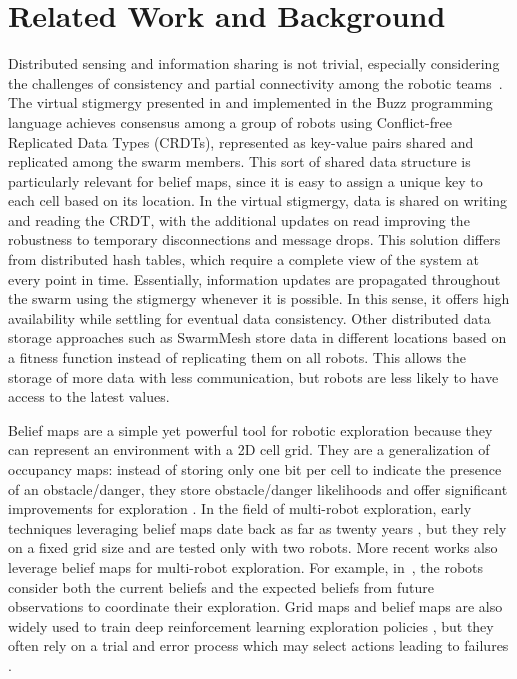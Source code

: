 \section{Related Work and Background}
Distributed sensing and information sharing is not trivial, especially considering
the challenges of consistency and partial connectivity among the
robotic teams~\cite{amigoni2017multirobot,otte2018emergent}. The virtual stigmergy
presented in \cite{pinciroliTuple2016} and implemented in the Buzz
programming language \cite{pinciroliBuzz2016} achieves consensus among
a group of robots using Conflict-free Replicated Data Types (CRDTs),
represented as key-value pairs shared and replicated among the swarm members. This sort of shared data structure is
particularly relevant for belief maps, since it is easy to assign a
unique key to each cell based on its location.  In the virtual
stigmergy, data is shared on writing and reading the CRDT, with the
additional updates on read improving the robustness to temporary
disconnections and message drops. This solution differs from
distributed hash tables, which require a complete view of the system
at every point in time. Essentially, information updates are propagated throughout the swarm using the stigmergy whenever it is possible. In this sense, it offers high availability while settling for eventual data consistency. Other distributed data storage approaches such
as SwarmMesh \cite{majcherczykSwarmmesh2020} store data in different
locations based on a fitness function instead of replicating them on
all robots. This allows the storage of more data with less
communication, but robots are less likely to have access to the latest
values.

Belief maps are a simple yet powerful tool for robotic exploration
because they can represent an environment with a 2D cell grid. They
are a generalization of occupancy maps: instead of storing only one
bit per cell to indicate the presence of an obstacle/danger, they
store obstacle/danger likelihoods and offer significant improvements
for exploration \cite{stachnissMappingExplorationMobile2003}. In the
field of multi-robot exploration, early techniques leveraging belief
maps date back as far as twenty years
\cite{kobayashiSharingExploringInformation2002,kobayashiDeterminationExplorationTarget2003},
but they rely on a fixed grid size and are tested only with two
robots. More recent works also leverage belief maps for multi-robot
exploration. For example,
in~\cite{indelmanCooperativeMultirobotBelief2018}, the robots consider
both the current beliefs and the expected beliefs from future
observations to coordinate their exploration. Grid maps and belief
maps are also widely used to train deep reinforcement learning
exploration policies
\cite{hanGridWiseControlMultiAgent,panovGridPathPlanning2018}, but they often rely on a trial and error process which may select actions leading to failures \cite{garciaSafeExplorationState2012,andersenSafeReinforcementlearningIndustrial2020}.

